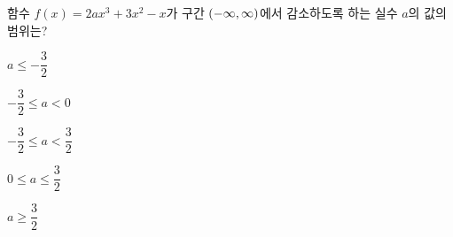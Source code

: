 함수 $f(x)=2ax^3+3x^2-x$가 구간 $(-\infty{,}\mkern3mu\mathopen{}\infty)$에서 감소하도록 하는 실수 $a$의 값의 범위는?
\begin{choicesii}{\rule[-3ex]{0pt}{8ex}$a\le-\dfrac{3}{2}$}{\rule[-3ex]{0pt}{8ex}$-\dfrac{3}{2}\le a<0$}{\rule[-3ex]{0pt}{8ex}$-\dfrac{3}{2}\le a<\dfrac{3}{2}$}{\rule[-3ex]{0pt}{8ex}$0\le a\le\dfrac{3}{2}$}{\rule[-3ex]{0pt}{8ex}$a\ge\dfrac{3}{2}$}\end{choicesii}
